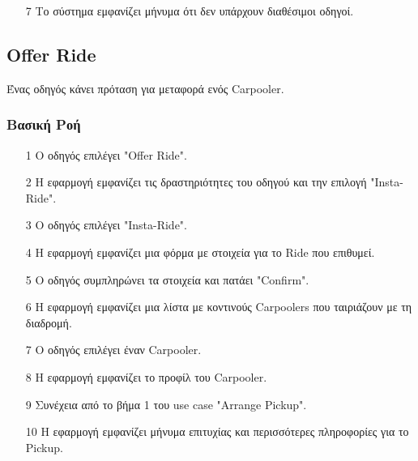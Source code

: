 \begin{enumerate}
    \item[7] Το σύστημα εμφανίζει μήνυμα ότι δεν υπάρχουν διαθέσιμοι οδηγοί.
\end{enumerate}


\newpage

\subsection{Offer Ride}
\label{uc:offer-ride}

Ένας οδηγός κάνει πρόταση για μεταφορά ενός Carpooler.

\subsubsection{Βασική Ροή}

\begin{enumerate}
    \item[1] Ο οδηγός επιλέγει "Offer Ride".
    \item[2] Η εφαρμογή εμφανίζει τις δραστηριότητες του οδηγού και την επιλογή "Insta-Ride".
    \item[3] Ο οδηγός επιλέγει "Insta-Ride".
    \item[4] Η εφαρμογή εμφανίζει μια φόρμα με στοιχεία για το Ride που επιθυμεί.
    \item[5] Ο οδηγός συμπληρώνει τα στοιχεία και πατάει "Confirm".
    \item[6] Η εφαρμογή εμφανίζει μια λίστα με κοντινούς Carpoolers που ταιριάζουν με τη διαδρομή.
    \item[7] Ο οδηγός επιλέγει έναν Carpooler.
    \item[8] Η εφαρμογή εμφανίζει το προφίλ του Carpooler.
    \item[9] Συνέχεια από το βήμα 1 του use case "Arrange Pickup".
    \item[10] Η εφαρμογή εμφανίζει μήνυμα επιτυχίας και περισσότερες πληροφορίες για το Pickup.
\end{enumerate}

